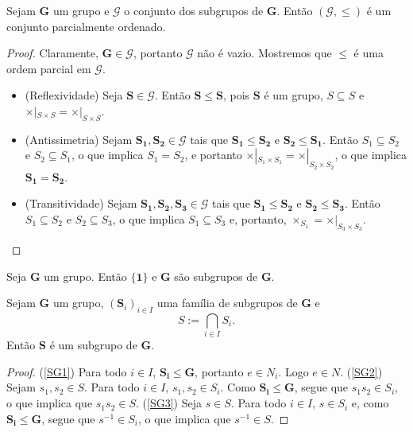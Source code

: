 \begin{proposition}
Sejam $\bm G$ um grupo e $\mathcal G$ o conjunto dos subgrupos de $\bm G$. Então $(\mathcal G,\leq)$ é um conjunto parcialmente ordenado.
\end{proposition}
\begin{proof}
Claramente, $\bm G \in \mathcal G$, portanto $\mathcal G$ não é vazio. Mostremos que $\leq$ é uma ordem parcial em $\mathcal G$.
	\begin{itemize}
	\item (Reflexividade) Seja $\bm S \in \mathcal G$. Então $\bm S \leq \bm S$, pois $\bm S$ é um grupo, $S \subseteq S$ e $\times|_{S \times S} = \times|_{S \times S}$.
	\item (Antissimetria) Sejam $\bm{S_1},\bm{S_2} \in \mathcal G$ tais que $\bm{S_1} \leq \bm{S_2}$ e $\bm{S_2} \leq \bm{S_1}$. Então $S_1 \subseteq S_2$ e $S_2 \subseteq S_1$, o que implica $S_1=S_2$, e portanto $\times|_{S_1 \times S_1} = \times|_{S_2 \times S_2}$, o que implica $\bm{S_1} = \bm{S_2}$.
	\item (Transitividade) Sejam  $\bm{S_1},\bm{S_2},\bm{S_3} \in \mathcal G$ tais que $\bm{S_1} \leq \bm{S_2}$ e $\bm{S_2} \leq \bm{S_3}$. Então $S_1 \subseteq S_2$ e $S_2 \subseteq S_3$, o que implica $S_1 \subseteq S_3$ e, portanto, $\times_{S_1} = \times|_{S_3 \times S_3}$.
	\end{itemize}
\end{proof}

\begin{exercise}
\label{alge:prop.subgru.triv}
Seja $\bm G$ um grupo. Então $\bm{\{1\}}$ e $\bm G$ são subgrupos de $\bm G$.
\end{exercise}

\begin{proposition}
\label{alge:prop.subgru.inter}
Sejam $\bm G$ um grupo, $(\bm S_i)_{i \in I}$ uma família de subgrupos de $\bm G$ e
	\begin{equation*}
	S := \bigcap_{i \in I} S_i.
	\end{equation*}
Então $\bm S$ é um subgrupo de $\bm G$.
\end{proposition}
\begin{proof}
(\ref{SG1}) Para todo $i \in I$, $\bm{S_i}\leq \bm G$, portanto $e \in N_i$. Logo $e \in N$. (\ref{SG2}) Sejam $s_1, s_2 \in S$. Para todo $i \in I$, $s_1,s_2 \in S_i$. Como $\bm{S_i} \leq \bm G$, segue que $s_1s_2 \in S_i$, o que implica que $s_1s_2 \in S$. (\ref{SG3}) Seja $s \in S$. Para todo $i \in I$, $s \in S_i$ e, como $\bm{S_i} \leq \bm{G}$, segue que $s^{-1} \in S_i$, o que implica que $s^{-1} \in S$.
\end{proof}

